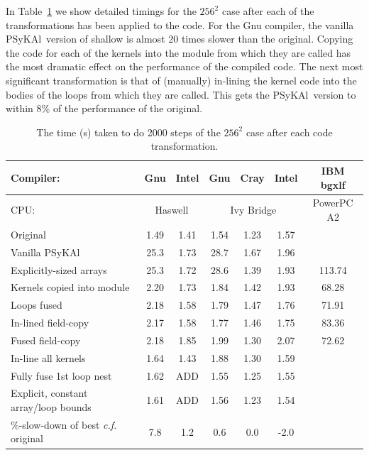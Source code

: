 \documentclass[journal]{IEEEtran}
\newcommand{\psykal}{{PS}y{KA}l\ }
\begin{document}
In Table~\ref{TABLE_opt_breakdown} we show detailed timings for the
$256^{2}$ case after each of the transformations has been applied to
the code. For the Gnu compiler, the vanilla \psykal version of shallow
is almost 20 times slower than the original. Copying the code for each
of the kernels into the module from which they are called has the most
dramatic effect on the performance of the compiled code. The next most
significant transformation is that of (manually) in-lining the kernel
code into the bodies of the loops from which they are called. This
gets the \psykal version to within 8\% of the performance of the
original.

\begin{table}[!t]
\renewcommand{\arraystretch}{1.3}
\caption{The time (s) taken to do 2000 steps of the $256^2$ case after each 
code transformation.}
\label{TABLE_opt_breakdown}
\centering
\begin{tabular}{l|c|c|c|c|c|c}
\hline
Compiler:          &  Gnu    & Intel   & Gnu & Cray & Intel & IBM bgxlf \\
\hline
CPU:               & \multicolumn{2}{c|}{Haswell} & \multicolumn{3}{c|}{Ivy Bridge} & PowerPC A2 \\
\hline
Original                             & 1.49 & 1.41 & 1.54 & 1.23 & 1.57  &        \\
Vanilla \psykal                      & 25.3 & 1.73 & 28.7 & 1.67 & 1.96  &        \\
Explicitly-sized arrays              & 25.3 & 1.72 & 28.6 & 1.39 & 1.93  & 113.74 \\
Kernels copied into module           & 2.20 & 1.73 & 1.84 & 1.42 & 1.93  &  68.28 \\
Loops fused                          & 2.18 & 1.58 & 1.79 & 1.47 & 1.76  &  71.91 \\
In-lined field-copy                  & 2.17 & 1.58 & 1.77 & 1.46 & 1.75  &  83.36 \\
Fused field-copy                     & 2.18 & 1.85 & 1.99 & 1.30 & 2.07  &  72.62 \\
In-line all kernels                  & 1.64 & 1.43 & 1.88 & 1.30 & 1.59  &        \\
Fully fuse 1st loop nest             & 1.62 & ADD  & 1.55 & 1.25 & 1.55  &        \\
Explicit, constant array/loop bounds & 1.61 & ADD  & 1.56 & 1.23 & 1.54  &        \\
\hline
\parbox{2.5cm}{\%-slow-down of best {\it c.f.} original} & 7.8 & 1.2 & 0.6 & 0.0 & -2.0 &     \\
\hline
\end{tabular}
\end{table}
\end{document}
